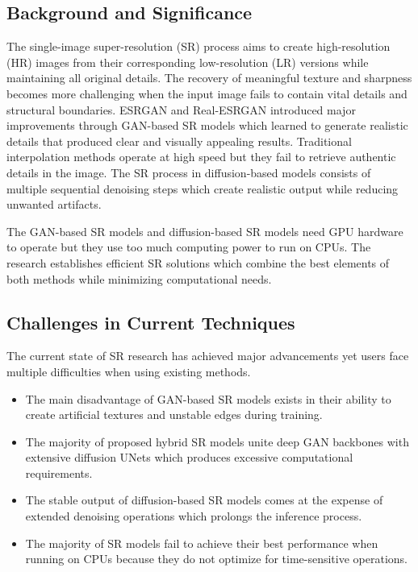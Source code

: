 \documentclass[conference]{IEEEtran}
\begin{document}
\subsection{Background and Significance}
The single-image super-resolution (SR) process aims to create high-resolution (HR) images from their corresponding low-resolution (LR) versions while maintaining all original details. The recovery of meaningful texture and sharpness becomes more challenging when the input image fails to contain vital details and structural boundaries. ESRGAN and Real-ESRGAN introduced major improvements through GAN-based SR models which learned to generate realistic details that produced clear and visually appealing results. Traditional interpolation methods operate at high speed but they fail to retrieve authentic details in the image. The SR process in diffusion-based models consists of multiple sequential denoising steps which create realistic output while reducing unwanted artifacts.

The GAN-based SR models and diffusion-based SR models need GPU hardware to operate but they use too much computing power to run on CPUs. The research establishes efficient SR solutions which combine the best elements of both methods while minimizing computational needs.

\subsection{Challenges in Current Techniques}
The current state of SR research has achieved major advancements yet users face multiple difficulties when using existing methods.

\begin{itemize}
    \item The main disadvantage of GAN-based SR models exists in their ability to create artificial textures and unstable edges during training.
    \item The majority of proposed hybrid SR models unite deep GAN backbones with extensive diffusion UNets which produces excessive computational requirements.
    \item The stable output of diffusion-based SR models comes at the expense of extended denoising operations which prolongs the inference process.
    \item The majority of SR models fail to achieve their best performance when running on CPUs because they do not optimize for time-sensitive operations.
\end{itemize}
\end{document}
